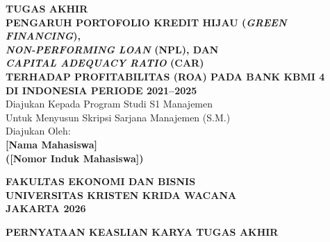 \documentclass[12pt,a4paper]{article}
\newcommand{\nahamahasiswa}{[Nama Mahasiswa]}
\newcommand{\nim}{[Nomor Induk Mahasiswa]}
\numberwithin{equation}{section}
\begin{document}
\pagestyle{frontmatter}

\thispagestyle{empty}
\begin{titlepage}
  \begin{center}
    \vspace*{0.5cm}
    {\large\bfseries TUGAS AKHIR}\\[1.2cm]

    {\large\bfseries
      PENGARUH PORTOFOLIO KREDIT HIJAU (\emph{GREEN FINANCING}),\\
      \emph{NON-PERFORMING LOAN} (NPL), DAN\\
      \emph{CAPITAL ADEQUACY RATIO} (CAR)\\
      TERHADAP PROFITABILITAS (ROA) PADA BANK KBMI 4\\
      DI INDONESIA PERIODE 2021--2025
    }\\[1.2cm]

    {\normalsize Diajukan Kepada Program Studi S1 Manajemen}\\[0.2cm]
    {\normalsize Untuk Menyusun Skripsi Sarjana Manajemen (S.M.)}\\[1.2cm]

    {\normalsize Diajukan Oleh:}\\[0.4cm]
    {\large\bfseries \nahamahasiswa}\\[0.2cm]
    {\large\bfseries (\nim)}\\[1.8cm]

    \vfill

    {\large\bfseries FAKULTAS EKONOMI DAN BISNIS}\\[0.3cm]
    {\large\bfseries UNIVERSITAS KRISTEN KRIDA WACANA}\\[0.3cm]
    {\large\bfseries JAKARTA 2026}
  \end{center}
\end{titlepage}

\addtocounter{page}{1}

\newpage
\thispagestyle{frontmatter}
\begin{center}
  {\large\bfseries PERNYATAAN KEASLIAN KARYA TUGAS AKHIR}
\end{center}
\end{document}
